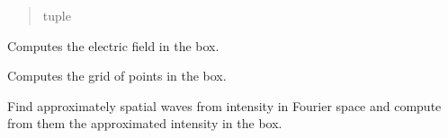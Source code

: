 \documentclass[letterpaper,10pt,english]{sphinxmanual}
\begin{document}
\begin{fulllineitems}
\begin{fulllineitems}
\begin{quote}
\begin{description}
\sphinxAtStartPar
tuple

\end{description}\end{quote}

\end{fulllineitems}


\begin{fulllineitems}
\label{\detokenize{source/Box:Box.Box.compute_electric_field}}
\pysigstartsignatures
\pysiglinewithargsret
{}
{}
{}
\pysigstopsignatures
\sphinxAtStartPar
Computes the electric field in the box.

\end{fulllineitems}


\begin{fulllineitems}
\label{\detokenize{source/Box:Box.Box.compute_grid}}
\pysigstartsignatures
\pysiglinewithargsret
{}
{}
{}
\pysigstopsignatures
\sphinxAtStartPar
Computes the grid of points in the box.

\end{fulllineitems}


\begin{fulllineitems}
\label{\detokenize{source/Box:Box.Box.compute_intensity_and_spatial_waves_numerically}}
\pysigstartsignatures
\pysiglinewithargsret
{}
{}
{}
\pysigstopsignatures
\sphinxAtStartPar
Find approximately spatial waves from intensity in Fourier space and compute from them the approximated intensity in the box.

\end{fulllineitems}


\begin{fulllineitems}
\label{\detokenize{source/Box:Box.Box.compute_intensity_fourier_space}}
\pysigstartsignatures
\pysiglinewithargsret
{}
{}
{}
\pysigstopsignatures
\end{fulllineitems}


\end{fulllineitems}
\end{document}
